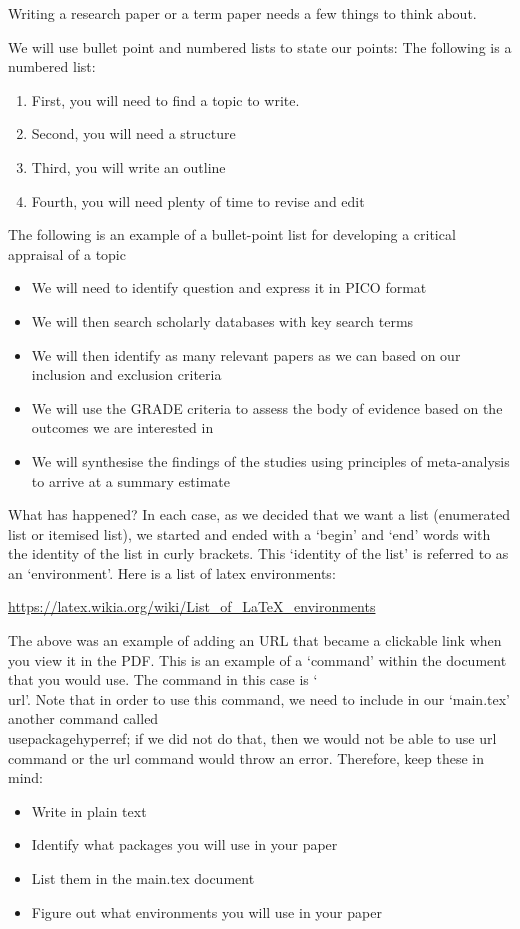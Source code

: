 Writing a research paper or a term paper needs a few things to think about. 

We will use bullet point and numbered lists to state our points:
The following is a numbered list:

\begin{enumerate}
    \item First, you will need to find a topic to write.
    \item Second, you will need a structure
    \item Third, you will write an outline
    \item Fourth, you will need plenty of time to revise and edit
\end{enumerate}

The following is an example of a bullet-point list for developing a critical appraisal of a topic

\begin{itemize}
    \item We will need to identify question and express it in PICO format
    \item We will then search scholarly databases with key search terms
    \item We will then identify as many relevant papers as we can based on our inclusion and exclusion criteria
    \item We will use the GRADE criteria to assess the body of evidence based on the outcomes we are interested in
    \item We will synthesise the findings of the studies using principles of meta-analysis to arrive at a summary estimate
\end{itemize}

What has happened? In each case, as we decided that we want a list (enumerated list or itemised list), we started and ended with a `begin' and `end' words with the identity of the list in curly brackets. This `identity of the list' is referred to as an `environment'. Here is a list of latex environments:

\url{https://latex.wikia.org/wiki/List_of_LaTeX_environments}

The above was an example of adding an URL that became a clickable link when you view it in the PDF. This is an example of a `command' within the document that you would use. The command in this case is `\\url'. Note that in order to use this command, we need to include in our `main.tex' another command called \\usepackage{hyperref}; if we did not do that, then we would not be able to use url command or the url command would throw an error. Therefore, keep these in mind:

\begin{itemize}
    \item Write in plain text
    \item Identify what packages you will use in your paper
    \item List them in the main.tex document
    \item Figure out what environments you will use in your paper
\end{itemize}{}